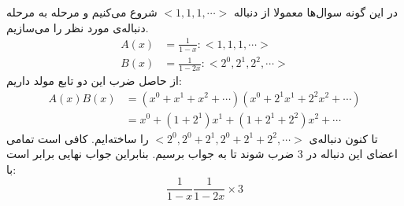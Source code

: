 \p
در این گونه سوال‌ها معمولا از دنباله
$< 1, 1, 1, \cdots >$
شروع می‌کنیم و مرحله به مرحله دنباله‌ی مورد نظر را می‌سازیم.
\begin{align*}
    A(x) &= \frac{1}{1-x}: < 1, 1, 1, \cdots >\\
    B(x) &= \frac{1}{1-2x}: < 2^0, 2^1, 2^2, \cdots >
\end{align*}
از حاصل ضرب این دو تابع مولد داریم:
\begin{align*}
    A(x)B(x) &= (x^0 + x^1 + x^2 + \cdots)(x^0 + 2^1x^1 + 2^2x^2 + \cdots)\\
    &= x^0 + (1 + 2^1)x^1 + (1 + 2^1 + 2^2)x^2 + \cdots
\end{align*}
تا کنون دنباله‌ی
$< 2^0, 2^0 + 2^1, 2^0 + 2^1 + 2^2, \cdots >$
را ساخته‌ایم. کافی است تمامی اعضای این دنباله در
$3$
ضرب شوند تا به جواب برسیم. بنابراین جواب نهایی برابر است با:
$$\frac{1}{1-x}\frac{1}{1-2x}\times3$$